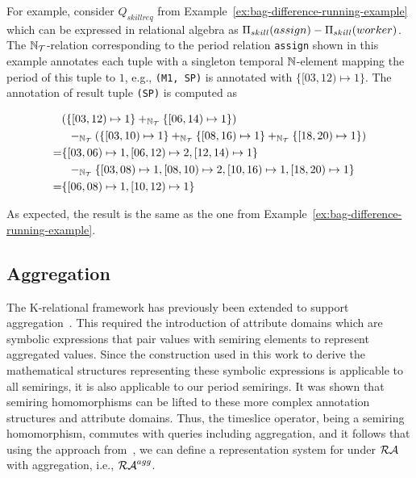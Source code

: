 For example, consider $Q_{skillreq}$ from Example~\ref{ex:bag-difference-running-example} which can be expressed in relational algebra as $\Pi_{skill}(assign) - \Pi_{skill}(worker)$. The ${{\mathbb{N}}}_{\mathcal{T}}$-relation corresponding to the period relation \texttt{assign} shown in this example annotates each tuple with a singleton temporal ${\mathbb{N}}$-element mapping the period of this tuple to $1$, e.g., \texttt{(M1, SP)} is annotated with $\{ [03,12) \mapsto 1 \}$. The annotation of result tuple \texttt{(SP)} is computed as\\[-8mm]
%
%
\begin{center}
{\small
\begin{align*}
  &(\{ [03,12) \mapsto 1 \} +_{{{\mathbb{N}}}_{\mathcal{T}}} \{ [06,14) \mapsto 1 \})\\
    &\hspace{2mm}-_{{{\mathbb{N}}}_{\mathcal{T}}} (\{ [03,10) \mapsto 1 \} +_{{{\mathbb{N}}}_{\mathcal{T}}} \{ [08,16) \mapsto 1 \} +_{{{\mathbb{N}}}_{\mathcal{T}}} \{ [18,20) \mapsto 1 \}) \\
  = &\{ [03,06) \mapsto 1, [06,12) \mapsto 2, [12,14) \mapsto 1\}\\
      &\hspace{2mm}-_{{{\mathbb{N}}}_{\mathcal{T}}} \{ [03,08) \mapsto 1, [08,10)      \mapsto 2, [10,16) \mapsto 1, [18,20) \mapsto 1 \} \\
  = &\{[06,08) \mapsto 1, [10,12) \mapsto 1 \}
\end{align*}
}
\end{center}
%
As expected, the result is the same as the one from Example~\ref{ex:bag-difference-running-example}.



\subsection{Aggregation}
\label{sec:aggregation}

The K-relational framework has previously been extended to support
aggregation~\cite{AD11d}. This required the introduction of attribute
domains which are symbolic expressions that pair values with semiring
elements to represent aggregated values.  Since the construction used
in this work to derive the mathematical structures representing these
symbolic expressions is applicable to all semirings, it is also
applicable to our period semirings. It was shown that
semiring homomorphisms can be lifted to these more complex annotation
structures and attribute domains. Thus, the timeslice operator, being
a semiring homomorphism, commutes with queries including aggregation,
and it follows that using the approach from~\cite{AD11d}, we can
define a representation system for \SKrels{} under
$\mathcal{RA}$ with aggregation, i.e., $\mathcal{RA}^{agg}$.

